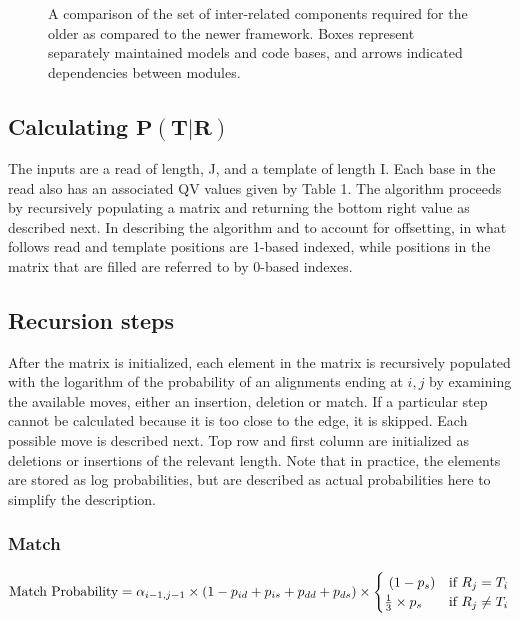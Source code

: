 \documentclass[fleqn,10pt]{SelfArx} %
\begin{document}
\begin{figure}[h] %
		\caption{A comparison of the set of inter-related components required for the older as compared to the newer framework.  Boxes represent separately maintained models and code bases, and arrows indicated dependencies between modules. }				
\end{figure}


\subsection{ Calculating $\mathbf{P(T|R)}$} 

The inputs are a read of length, J, and a template of length I.  Each base in the read also has an associated QV values given by Table 1.   The algorithm proceeds by recursively populating a matrix and returning the bottom right value as described next.  In describing the algorithm and to account for offsetting, in what follows read and template positions are 1-based indexed, while positions in the matrix that are filled are referred to by 0-based indexes. 






\subsection{Recursion steps}
After the matrix is initialized, each element in the matrix is recursively populated with the logarithm of the probability of an alignments ending at $i,j$ by examining the available moves, either an insertion, deletion or match.  If a particular step cannot be calculated because it is too close to the edge, it is skipped.  Each possible move is described next.  Top row and first column are initialized as deletions or insertions of the relevant length.  Note that in practice, the elements are stored as log probabilities, but are described as actual probabilities here to simplify the description.






\subsubsection{\textbf{Match}}

\begin{dmath}
\text{Match Probability} = \\
	 \alpha_{i-1,j-1}  \times  (1-p_{id}+p_{is}+p_{dd}+p_{ds})  \times 
	 \begin{cases}
							 \ (1-p_{s}) & \text{if }  R_{j} = T_{i} \\
							 \frac{1}{3} \times p_{s}  & \text{if }  R_{j}  \neq T_{i} 
							 \end{cases}
\end{dmath}
\end{document}
